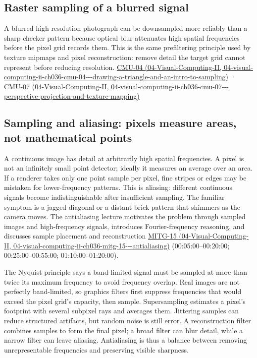 \subsection{Raster sampling of a blurred signal}\label{03-visual-computing-i-ch003-raster-sampling-of-a-blurred-signal}

A blurred high-resolution photograph can be downsampled more reliably than a sharp checker pattern because optical blur attenuates high spatial frequencies before the pixel grid records them. This is the same prefiltering principle used by texture mipmaps and pixel reconstruction: remove detail the target grid cannot represent before reducing resolution. \href{../04-Visual-Computing-II/main.pdf\#nameddest=04-visual-computing-ii-ch036-cmu-04---drawing-a-triangle-and-an-intro-to-sampling}{CMU-04 (04-Visual-Computing-II, 04-visual-computing-ii-ch036-cmu-04-\/-\/-drawing-a-triangle-and-an-intro-to-sampling)} · \href{../04-Visual-Computing-II/main.pdf\#nameddest=04-visual-computing-ii-ch036-cmu-07---perspective-projection-and-texture-mapping}{CMU-07 (04-Visual-Computing-II, 04-visual-computing-ii-ch036-cmu-07-\/-\/-perspective-projection-and-texture-mapping)}

\subsection{Sampling and aliasing: pixels measure areas, not mathematical points}\label{03-visual-computing-i-ch003-sampling-and-aliasing-pixels-measure-areas-not-mathematical-points}

A continuous image has detail at arbitrarily high spatial frequencies. A pixel is not an infinitely small point detector; ideally it measures an average over an area. If a renderer takes only one point sample per pixel, fine stripes or edges may be mistaken for lower-frequency patterns. This is aliasing: different continuous signals become indistinguishable after insufficient sampling. The familiar symptom is a jagged diagonal or a distant brick pattern that shimmers as the camera moves. The antialiasing lecture motivates the problem through sampled images and high-frequency signals, introduces Fourier-frequency reasoning, and discusses sample placement and reconstruction \href{../04-Visual-Computing-II/main.pdf\#nameddest=04-visual-computing-ii-ch036-mitg-15---antialiasing}{MITG-15 (04-Visual-Computing-II, 04-visual-computing-ii-ch036-mitg-15-\/-\/-antialiasing)} (00:05:00--00:20:00; 00:25:00--00:55:00; 01:10:00--01:20:00).

The Nyquist principle says a band-limited signal must be sampled at more than twice its maximum frequency to avoid frequency overlap. Real images are not perfectly band-limited, so graphics filters first suppress frequencies that would exceed the pixel grid's capacity, then sample. Supersampling estimates a pixel's footprint with several subpixel rays and averages them. Jittering samples can reduce structured artifacts, but random noise is still error. A reconstruction filter combines samples to form the final pixel; a broad filter can blur detail, while a narrow filter can leave aliasing. Antialiasing is thus a balance between removing unrepresentable frequencies and preserving visible sharpness.

